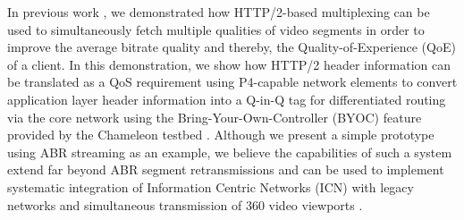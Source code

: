 In previous work \cite{acm-mmhttp2}, we demonstrated how HTTP/2-based multiplexing can be used to simultaneously fetch multiple qualities of video segments in order to improve the average bitrate quality and thereby, the Quality-of-Experience (QoE) of a client. In this demonstration, we show how HTTP/2 header information can be translated as a QoS requirement using P4-capable network elements to convert application layer header information into a Q-in-Q tag for differentiated routing via the core network using the Bring-Your-Own-Controller (BYOC) feature \cite{chameleon-byoc} provided by the Chameleon testbed \cite{Mambretti:2015}. Although we present a simple prototype using ABR streaming as an example, we believe the capabilities of such a system extend far beyond ABR segment retransmissions and can be used to implement systematic integration of Information Centric Networks (ICN) \cite{Ghodsi:2011} with legacy networks and simultaneous transmission of 360 video viewports \cite{hosseini2016adaptive}. %


